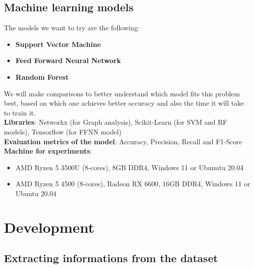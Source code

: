 \documentclass[11pt,a4paper]{article}
\begin{document}
\subsection*{Machine learning models}

The models we want to try are the following:
\begin{itemize}
	\setlength\itemsep{-0.3em}
	\item \textbf{Support Vector Machine}
	\item \textbf{Feed Forward Neural Network}
	\item \textbf{Random Forest}
\end{itemize}

We will make comparisons to better understand which model fits this problem best, based on which one achieves better accuracy and also the time it will take to train it.
\\\textbf{Libraries}: Networkx\cite{networkx} (for Graph analysis), Scikit-Learn (for SVM and RF models), Tensorflow (for FFNN model)
\\\textbf{Evaluation metrics of the model}: Accuracy, Precision, Recall and F1-Score
\\\textbf{Machine for experiments}: 
\begin{itemize}
	\setlength\itemsep{-0.3em}
	\item AMD Ryzen 5 3500U (8-cores), 8GB DDR4, Windows 11 or Ubunutu 20.04
	\item AMD Ryzen 5 4500 (8-cores), Radeon RX 6600, 16GB DDR4, Windows 11 or Ubuntu 20.04
\end{itemize}

\newpage

\section*{Development}

\subsection*{Extracting informations from the dataset}
\end{document}
